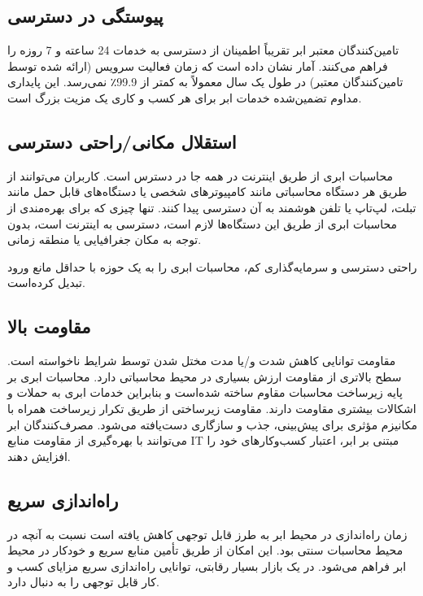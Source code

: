 \documentclass{book}
\begin{document}
    \subsection{پیوستگی در دسترسی}

        تامین‌کنندگان معتبر ابر تقریباً اطمینان از دسترسی به خدمات 24 ساعته و 7 روزه را فراهم می‌کنند. آمار نشان داده است که زمان فعالیت سرویس (ارائه شده توسط تامین‌کنندگان معتبر) در طول یک سال معمولاً به کمتر از 99.9٪ نمی‌رسد. این پایداری مداوم تضمین‌شده خدمات ابر برای هر کسب و کاری یک مزیت بزرگ است.

    \subsection{استقلال مکانی/راحتی دسترسی}

        محاسبات ابری از طریق اینترنت در همه جا در دسترس است. کاربران می‌توانند از طریق هر دستگاه محاسباتی مانند کامپیوترهای شخصی یا دستگاه‌های قابل حمل مانند تبلت، لپ‌تاپ یا تلفن هوشمند به آن دسترسی پیدا کنند. تنها چیزی که برای بهره‌مندی از محاسبات ابری از طریق این دستگاه‌ها لازم است، دسترسی به اینترنت است، بدون توجه به مکان جغرافیایی یا منطقه زمانی.

    \begin{addinfo}

        راحتی دسترسی و سرمایه‌گذاری کم، محاسبات ابری را به یک حوزه با حداقل مانع ورود تبدیل کرده‌است.

    \end{addinfo}

    \subsection{مقاومت بالا}

        مقاومت توانایی کاهش شدت و/یا مدت مختل شدن توسط شرایط ناخواسته است. سطح بالاتری از مقاومت ارزش بسیاری در محیط محاسباتی دارد. محاسبات ابری بر پایه زیرساخت محاسبات مقاوم ساخته شده‌است و بنابراین خدمات ابری به حملات و اشکالات بیشتری مقاومت دارند. مقاومت زیرساختی از طریق تکرار زیرساخت همراه با مکانیزم مؤثری برای پیش‌بینی، جذب و سازگاری دست‌یافته می‌شود. مصرف‌کنندگان ابر می‌توانند با بهره‌گیری از مقاومت منابع IT مبتنی بر ابر، اعتبار کسب‌وکارهای خود را افزایش دهند.

    \subsection{راه‌اندازی سریع}

        زمان راه‌اندازی در محیط ابر به طرز قابل توجهی کاهش یافته است نسبت به آنچه در محیط محاسبات سنتی بود. این امکان از طریق تأمین منابع سریع و خودکار در محیط ابر فراهم می‌شود. در یک بازار بسیار رقابتی، توانایی راه‌اندازی سریع مزایای کسب و کار قابل توجهی را به دنبال دارد.
\end{document}
